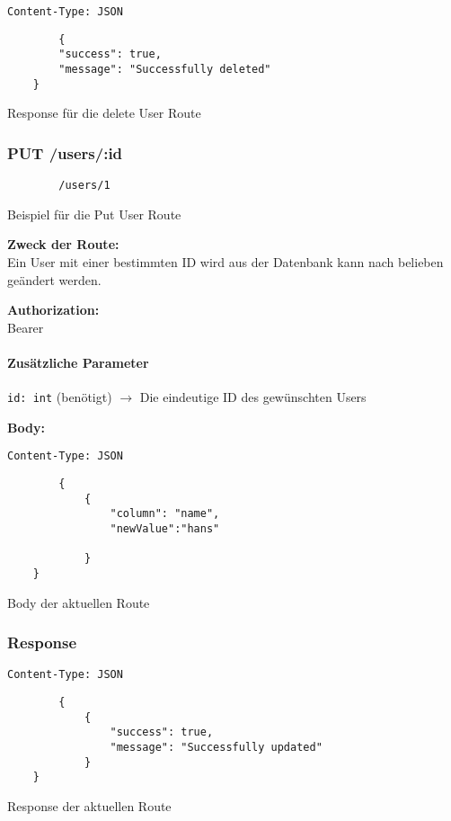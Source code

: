 \begin{code}
    \lstinline{Content-Type: JSON}
    \begin{lstlisting}
        {
        "success": true,
        "message": "Successfully deleted"
    }
    \end{lstlisting}
    \caption{Response für die delete User Route}
\end{code}

\pagebreak


\subsubsection{PUT /users/:id}

\begin{code}
    \begin{lstlisting}
        /users/1
    \end{lstlisting}
    \caption{Beispiel für die Put User Route}
\end{code}

\textbf{Zweck der Route:} \\
Ein User mit einer bestimmten ID wird aus der Datenbank kann nach belieben geändert
werden.

\textbf{Authorization:} \\
Bearer

\paragraph{Zusätzliche Parameter}
\lstinline{id: int} (benötigt)
$\rightarrow$ Die eindeutige ID des gewünschten Users

\textbf{Body:}\\
\begin{code}
    \lstinline{Content-Type: JSON}
    \begin{lstlisting}
        {
            {
                "column": "name",
                "newValue":"hans"
    
            }
    }
    \end{lstlisting}
    \caption{Body der aktuellen Route}
\end{code}


\subsubsection{Response}

\begin{code}
    \lstinline{Content-Type: JSON}
    \begin{lstlisting}
        {
            {
                "success": true,
                "message": "Successfully updated"
            }
    }
    \end{lstlisting}
    \caption{Response der aktuellen Route}
\end{code}

\pagebreak

